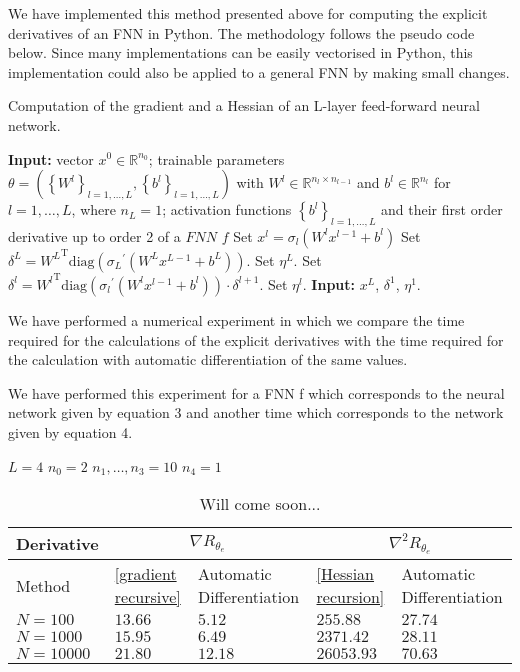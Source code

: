 We have implemented this method presented above for computing the explicit derivatives of an FNN in Python. The methodology follows the pseudo code below. Since many implementations can be easily vectorised in Python, this implementation could also be applied to a general FNN by making small changes.
\begin{algorithm}[H]
    \caption{Computation of the gradient and a Hessian of an L-layer feed-forward neural network.}
    \begin{algorithmic}[1]
        \State \textbf{Input:} vector $x^0 \in \mathbb{R}^{n_0}$; trainable parameters $\theta = \left(\left\{ W^l \right\}_{l = 1, \ldots, L}, \left\{ b^l \right\}_{l = 1, \ldots, L}\right)$ with $W^l \in \mathbb{R}^{n_l \times n_{l-1}}$ and $b^l \in \mathbb{R}^{n_l}$ for $l = 1, \ldots, L$, where $n_L = 1$; activation functions $\left\{ b^l \right\}_{l = 1, \ldots, L}$ and their first order derivative up to order 2 of a $FNN$ $f$
            \State Set $x^l = \sigma_l\left(W^l x^{l-1} + b^l\right)$
        \EndFor
        \State Set $\delta^{L} = {W^{L}}^{\mathrm{T}} \mathrm{diag}\left({\sigma_{L}}^{\prime}\left(W^{L} x^{L-1} + b^{L}\right)\right)$.
        \State Set $\eta^{L}$.
            \State Set $\delta^{l} = {W^{l}}^{\mathrm{T}} \mathrm{diag}\left({\sigma_{l}}^{\prime}\left(W^{l} x^{l-1} + b^{l}\right)\right) \cdot \delta^{l+1}$.
            \State Set $\eta^{l}$.
        \EndFor
        \State \textbf{Input:} $x^L$, $\delta^1$, $\eta^1$.
    \end{algorithmic}
\end{algorithm}
We have performed a numerical experiment in which we compare the time required for the calculations of the explicit derivatives with the time required for the calculation with automatic differentiation of the same values. 

We have performed this experiment for a FNN f which corresponds to the neural network given by equation 3 and another time which corresponds to the network given by equation 4. 

$L = 4$ $n_0 = 2$ $n_1, \ldots, n_3 = 10$ $n_4 = 1$
\begin{table}[H]\label{tab:advs ecplicit: ResNet}
    \resizebox{\textwidth}{!}
    {
        \begin{tabular}{l l l l l }
            \toprule
            Derivative & \multicolumn{2}{c}{$\nabla R_{\theta_e}$}& \multicolumn{2}{c}{$\nabla^2 R_{\theta_e}$} \\ 
            \midrule
            Method & \cref{gradient recursive} & Automatic Differentiation & \cref{Hessian recursion} & Automatic Differentiation \\ 
            \midrule
            $N = 100$ & $13.66$ & $5.12$ & $255.88$ & $27.74$ \\ 
            \midrule
            $N = 1000$ & $15.95$ & $6.49$ & $2371.42$ & $28.11$ \\ 
            \midrule
            $N = 10000$ & $21.80$ & $12.18$ & $26053.93$ & $70.63$ \\ 
            \bottomrule
        \end{tabular}
    }
    \caption{Will come soon...}
\end{table}
